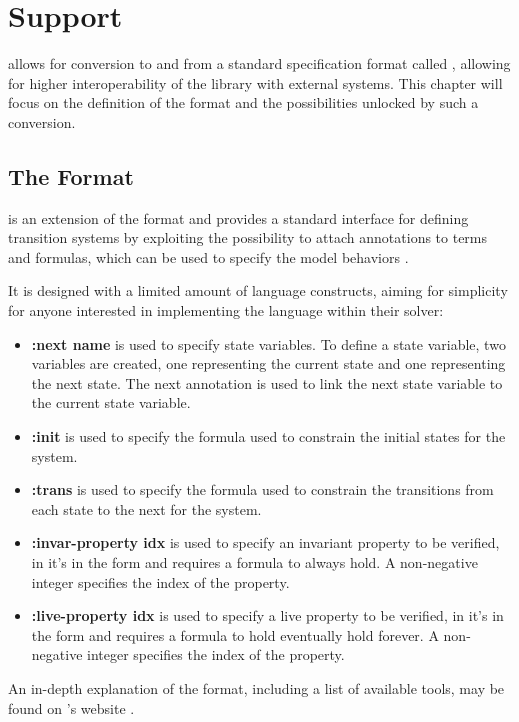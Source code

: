 \chapter{\vmtlib{} Support}
\label{ch:vmtlib}
\pyvmt{} allows for conversion to and from a standard specification format called \vmtlib{}, allowing for higher interoperability of the library with external systems.
This chapter will focus on the definition of the format and the possibilities unlocked by such a conversion.

\section{The \vmtlib{} Format}
\vmtlib{} is an extension of the \smtlib{} format and provides a standard interface for defining transition systems by exploiting the possibility to attach annotations to terms and formulas, which can be used to specify the model behaviors \cite{DBLP:journals/corr/abs-2109-12821}.

It is designed with a limited amount of language constructs, aiming for simplicity for anyone interested in implementing the language within their \vmt{} solver:
\begin{itemize}
    \item \textbf{:next name} is used to specify state variables. To define a state variable, two variables are created, one representing the current state and one representing the next state. The next annotation is used to link the next state variable to the current state variable.
    \item \textbf{:init} is used to specify the formula used to constrain the initial states for the system.
    \item \textbf{:trans} is used to specify the formula used to constrain the transitions from each state to the next for the system.
    \item \textbf{:invar-property idx} is used to specify an invariant property to be verified, in \ltl{} it's in the form \fsafe{} and requires a formula to always hold. A non-negative integer specifies the index of the property.
    \item \textbf{:live-property idx} is used to specify a live property to be verified, in \ltl{} it's in the form \flive{} and requires a formula to hold eventually hold forever. A non-negative integer specifies the index of the property.
\end{itemize}

An in-depth explanation of the format, including a list of available tools, may be found on \vmtlib{}'s website \cite{VMT-LIB}.

